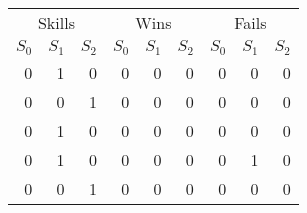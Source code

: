 \begin{tabular}{rrrrrrrrr}
\toprule
\multicolumn{3}{c}{Skills} & \multicolumn{3}{c}{Wins} & \multicolumn{3}{c}{Fails}\\
\cmidrule{1-3} \cmidrule{4-6} \cmidrule{7-9}
 $S_0$ &  $S_1$ &  $S_2$ &  $S_0$ &  $S_1$ &  $S_2$ &  $S_0$ &  $S_1$ &  $S_2$ \\
\midrule
 0 &  1 &  0 &  0 &  0 &  0 &  0 &  0 &  0 \\
 0 &  0 &  1 &  0 &  0 &  0 &  0 &  0 &  0 \\
 0 &  \alert1 &  0 &  0 &  0 &  0 &  0 &  0 &  0 \\
 0 &  \alert1 &  0 &  0 &  0 &  0 &  0 &  \alert1 &  0 \\
 0 &  0 &  1 &  0 &  0 &  0 &  0 &  0 &  0 \\
\bottomrule
\end{tabular}
